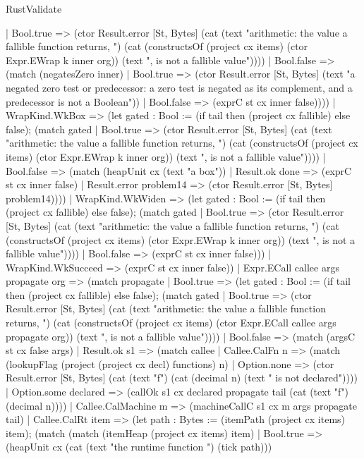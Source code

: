 \begin{lexlean}{RustValidate}
\begin{semanticmodule}
{        | Bool.true => (ctor Result.error [St, Bytes] (cat (text "arithmetic: the value a fallible function returns, ") (cat (constructsOf (project cx items) (ctor Expr.EWrap k inner org)) (text ", is not a fallible value"))))
        | Bool.false => (match (negatesZero inner)
          | Bool.true => (ctor Result.error [St, Bytes] (text "a negated zero test or predecessor: a zero test is negated as its complement, and a predecessor is not a Boolean"))
          | Bool.false => (exprC st cx inner false))))
      | WrapKind.WkBox => (let gated : Bool := (if tail then (project cx fallible) else false); (match gated
        | Bool.true => (ctor Result.error [St, Bytes] (cat (text "arithmetic: the value a fallible function returns, ") (cat (constructsOf (project cx items) (ctor Expr.EWrap k inner org)) (text ", is not a fallible value"))))
        | Bool.false => (match (heapUnit cx (text "a box"))
          | Result.ok done => (exprC st cx inner false)
          | Result.error problem14 => (ctor Result.error [St, Bytes] problem14))))
      | WrapKind.WkWiden => (let gated : Bool := (if tail then (project cx fallible) else false); (match gated
        | Bool.true => (ctor Result.error [St, Bytes] (cat (text "arithmetic: the value a fallible function returns, ") (cat (constructsOf (project cx items) (ctor Expr.EWrap k inner org)) (text ", is not a fallible value"))))
        | Bool.false => (exprC st cx inner false)))
      | WrapKind.WkSucceed => (exprC st cx inner false))
    | Expr.ECall callee args propagate org => (match propagate
      | Bool.true => (let gated : Bool := (if tail then (project cx fallible) else false); (match gated
        | Bool.true => (ctor Result.error [St, Bytes] (cat (text "arithmetic: the value a fallible function returns, ") (cat (constructsOf (project cx items) (ctor Expr.ECall callee args propagate org)) (text ", is not a fallible value"))))
        | Bool.false => (match (argsC st cx false args)
          | Result.ok s1 => (match callee
            | Callee.CalFn n => (match (lookupFlag (project (project cx decl) functions) n)
              | Option.none => (ctor Result.error [St, Bytes] (cat (text "f") (cat (decimal n) (text " is not declared"))))
              | Option.some declared => (callOk s1 cx declared propagate tail (cat (text "f") (decimal n))))
            | Callee.CalMachine m => (machineCallC s1 cx m args propagate tail)
            | Callee.CalRt item => (let path : Bytes := (itemPath (project cx items) item); (match (match (itemHeap (project cx items) item)
                | Bool.true => (heapUnit cx (cat (text "the runtime function ") (tick path)))
}
\end{semanticmodule}
\end{lexlean}
